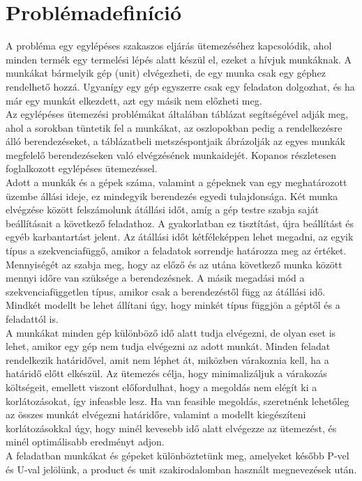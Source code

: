 \documentclass {report}
\begin{document}
\chapter{Problémadefiníció}
A probléma egy egylépéses szakaszos eljárás ütemezéséhez kapcsolódik, ahol minden termék egy termelési lépés alatt készül el, ezeket a hívjuk munkáknak. A munkákat bármelyik gép (unit) elvégezheti, de egy munka csak egy géphez rendelhető hozzá. Ugyanígy egy gép egyszerre csak egy feladaton dolgozhat, és ha már egy munkát elkezdett, azt egy másik nem előzheti meg. \\
Az egylépéses ütemezési problémákat általában táblázat segítségével adják meg, ahol a sorokban tüntetik fel a munkákat, az oszlopokban pedig a rendelkezésre álló berendezéseket, a táblázatbeli metszéspontjaik ábrázolják az egyes munkák megfelelő berendezéseken való elvégzésének munkaidejét. Kopanos részletesen foglalkozott egylépéses ütemezéssel. \cite{Kopanos2009}\\
Adott a munkák és a gépek száma, valamint a gépeknek van egy meghatározott üzembe állási ideje, ez mindegyik berendezés egyedi tulajdonsága. Két munka elvégzése között felszámolunk átállási időt, amíg a gép testre szabja saját beállításait a következő feladathoz. A gyakorlatban ez tisztítást, újra beállítást és egyéb karbantartást jelent. Az átállási időt kétféleképpen lehet megadni, az egyik típus a szekvenciafüggő, amikor a feladatok sorrendje határozza meg az értéket. Mennyiségét az szabja meg, hogy az előző és az utána következő munka között mennyi időre van szüksége a berendezésnek. A másik megadási mód a szekvenciafüggetlen típus, amikor csak a berendezéstől függ az átállási idő. Mindkét modellt be lehet állítani úgy, hogy minkét típus függjön a géptől és a feladattól is. \\
A munkákat minden gép különböző idő alatt tudja elvégezni, de olyan eset is lehet, amikor egy gép nem tudja elvégezni az adott munkát. Minden feladat rendelkezik határidővel, amit nem léphet át, miközben várakoznia kell, ha a határidő előtt elkészül. Az ütemezés célja, hogy minimalizáljuk a várakozás költségeit, emellett viszont előfordulhat, hogy a megoldás nem elégít ki a korlátozásokat, így infeasble lesz. Ha van feasible megoldás, szeretnénk lehetőleg az összes munkát elvégezni határidőre, valamint a modellt kiegészíteni korlátozásokkal úgy, hogy minél kevesebb idő alatt elvégezze az ütemezést, és minél optimálisabb eredményt adjon.  \\
A feladatban munkákat és gépeket különböztetünk meg, amelyeket később P-vel és U-val jelölünk, a product és unit szakirodalomban használt megnevezések után. \cite{Behrmann2001}
 
\end{document}
